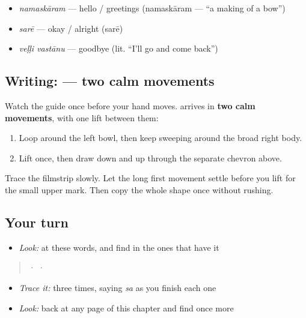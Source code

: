 \begin{itemize}
\raggedright
  \item \textbf{} \emph{namaskāram} — hello / greetings (namaskāram — \textquotedblleft{}a making of a bow\textquotedblright{})
  \item \textbf{} \emph{sarē} — okay / alright (sarē)
  \item \textbf{ } \emph{veḷḷi vastānu} — goodbye (lit. \textquotedblleft{}I'll go and come back\textquotedblright{})
\end{itemize}

\subsection*{Writing:  — two calm movements}

Watch the guide once before your hand moves.  arrives in \textbf{two calm movements}, with one lift between them:

\begin{enumerate}
\raggedright
  \item Loop around the left bowl, then keep sweeping around the broad right body.
  \item Lift once, then draw down and up through the separate chevron above.
\end{enumerate}

Trace the filmstrip slowly. Let the long first movement settle before you lift for the small upper mark. Then copy the whole shape once without rushing.

\subsection*{Your turn}
\begin{itemize}
\raggedright
  \item \emph{Look:} at these words, and find  in the ones that have it
\end{itemize}

\begin{quote}
  ·    ·  
\end{quote}

\begin{itemize}
\raggedright
  \item \emph{Trace it:}  three times, saying \emph{sa} as you finish each one
  \item \emph{Look:} back at any page of this chapter and find  once more
\end{itemize}

